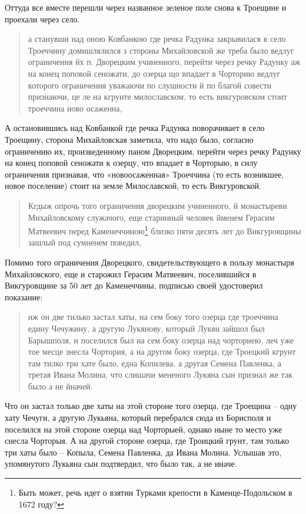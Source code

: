 Оттуда все вместе перешли через названное зеленое поле снова к Троещине и проехали через село.

\begin{quotation}
а станувши над оною Ковбанкою где речка Радунка закрывилася в село Троеччину домишлялился з стороны Михайловской же треба было ведлуг ограничення йх п. Дворецким учиненного, перейти через речку Радунку аж на конец поповой сеножати, до озерца що впадает в Чорторию ведлуг которого ограничения уважаючи по слушности й по благой совести признаючи, це ле на кгрунте милославском, то есть викгуровском стоит троеччина ново осаженна, 
\end{quotation}

А остановившись над Ковбанкой где речка Радунка поворачивает в село Троещину, сторона Михайловская заметила, что надо было, согласно ограничению их, произведенному паном Дворецким, перейти через речку Радунку на конец поповой сеножати к озерцу, что впадает в Чорторыю, в силу ограничения признавая, что «новоосаженная» Троеччина (то есть возникшее, новое поселение) стоит на земле Милославской, то есть Викгуровской.

\begin{quotation}
Кгдыж опрочь того ограничения дворецким учиненного, й монастыреви Михайловскому служачого, еще старинный человек йменем Герасим Матвеевич перед Каменеччиною\footnote{Быть может, речь идет о взятии Турками крепости в Каменце-Подольском в 1672 году?} близко пяти десять лет до Викгуровщины зашлый под сумненем поведил,
\end{quotation}

Помимо того ограничения Дворецкого, свидетельствующего в пользу монастыря Михайловского, еще и старожил Герасим Матвеевич, поселившийся в Викгуровщине за 50 лет до Каменеччины, подписью своей удостоверил показание:

\begin{quotation}
иж он две тилько застал хаты, на сем боку того озерца где троеччина едину Чечужину, а другую Лукянову, который Лукян зайшол был Барышполя, и поселился был на сем боку озерца над чорториею, леч уже тое месце знесла Чортория, а на другом боку озерца, где Троецкий кгрунт там тилко три хате было, една Копилева, а другая Семена Павленка, а третая Ивана Молина, что слишачи мененого Лукяна сын признал же так было а не йначей.
\end{quotation}

Что он застал только две хаты на этой стороне того озерца, где Троещина – одну хату Чечуги, а другую Лукьяна, который перебрался сюда из Борисполя и поселился на этой стороне озерца над Чорторыей, однако ныне то место уже снесла Чорторыя. А на другой стороне озерца, где Троицкий грунт, там только три хаты было – Копыла, Семена Павленка, да Ивана Молина. Услышав это, упомянутого Лукьяна сын подтвердил, что было так, а не иначе.

